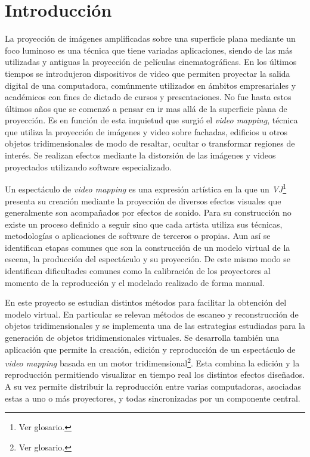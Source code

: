 ﻿\chapter{Introducción}

La proyección de imágenes amplificadas sobre una superficie plana mediante un foco luminoso es una técnica que tiene variadas aplicaciones, siendo de las más utilizadas y antiguas la proyección de películas cinematográficas. En los últimos tiempos se introdujeron dispositivos de video que permiten proyectar la salida digital de una computadora, comúnmente utilizados en ámbitos empresariales y académicos con fines de dictado de cursos y presentaciones. No fue hasta estos últimos años que se comenzó a pensar en ir mas allá de la superficie plana de proyección. Es en función de esta inquietud que surgió el \emph{video mapping}, técnica que utiliza la proyección de imágenes y video sobre fachadas, edificios
u otros objetos tridimensionales de modo de resaltar, ocultar o transformar regiones de interés. Se realizan efectos mediante la distorsión de las imágenes y videos proyectados utilizando software especializado.

Un espectáculo de \emph{video mapping} es una expresión artística en la que un \emph{VJ}\footnote{Ver glosario.} presenta su creación mediante la proyección de diversos efectos visuales que generalmente son acompañados por efectos de sonido. Para su construcción no existe un proceso definido a seguir sino que cada artista utiliza sus técnicas, metodologías o aplicaciones de software de terceros o propias. Aun así se identifican etapas comunes que son la construcción de un modelo virtual de la escena, la producción del espectáculo y su proyección. De este mismo modo se identifican dificultades comunes como la calibración de los proyectores al momento de la reproducción y el modelado realizado de forma manual.

En este proyecto se estudian distintos métodos para facilitar la obtención del modelo virtual. En particular se relevan métodos de escaneo y reconstrucción de objetos tridimensionales y se implementa una de las estrategias estudiadas para la generación de objetos tridimensionales virtuales. %
Se desarrolla también una aplicación que permite la creación, edición y reproducción de un espectáculo de \emph{video mapping} basada en un motor tridimensional\footnote{Ver glosario.}. Esta combina la edición y la reproducción permitiendo visualizar en tiempo real los distintos efectos diseñados. A su vez permite distribuir la reproducción entre varias computadoras, asociadas estas a uno o más proyectores, y todas sincronizadas por un componente central.

